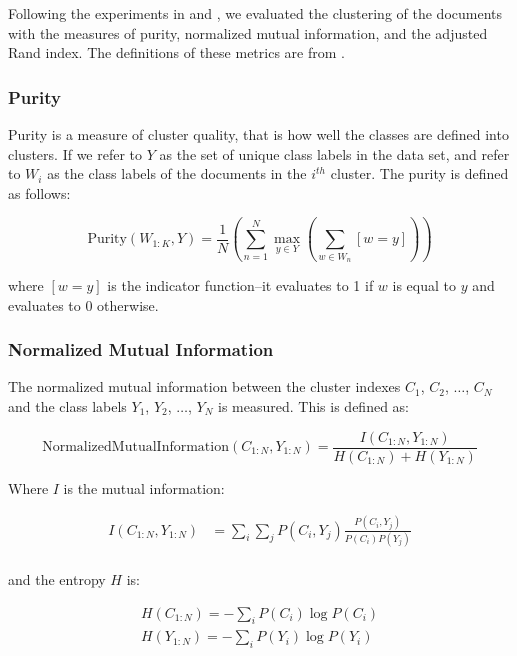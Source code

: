 \documentclass[11pt]{article}
\begin{document}
Following the experiments in \cite{Huang2008} and \cite{Hofmann2000}, we evaluated the clustering of the documents with the measures of purity, normalized mutual information, and the adjusted Rand index. The definitions of these metrics are from \cite{Manning2008}.

\subsubsection{Purity}

Purity is a measure of cluster quality, that is how well the classes are defined into clusters. If we refer to $Y$ as the set of unique class labels in the data set, and refer to $W_i$ as the class labels of the documents in the $i^{th}$ cluster. The purity is defined as follows:

\begin{equation}
{\text{Purity}}(W_{1:K}, Y) = \frac{1}{N} \left ( \sum_{n=1}^N \max_{y \in Y} \left (\sum_{w \in W_n} [w = y] \right ) \right )
\end{equation} 

where $[w=y]$ is the indicator function--it evaluates to 1 if $w$ is equal to $y$ and evaluates to 0 otherwise. 

\subsubsection{Normalized Mutual Information}

The normalized mutual information between the cluster indexes $C_1$, $C_2$, $\dots$, $C_N$ and the class labels  $Y_1$, $Y_2$, $\dots$, $Y_N$ is measured. This is defined as:

\begin{equation}
\text{NormalizedMutualInformation}(C_{1:N}, Y_{1:N}) = \frac{I(C_{1:N}, Y_{1:N}) }{H(C_{1:N}) + H(Y_{1:N}) }
\end{equation}

Where $I$ is the mutual information:

\begin{align}
I(C_{1:N}, Y_{1:N}) &= \sum_i \sum_j {P(C_i, Y_j)} \frac{P(C_i, Y_j)}{P(C_i)P(Y_j)} \\
\end{align}

and the entropy $H$ is:

\begin{align}
H(C_{1:N}) = - \sum_i P(C_i) \log P(C_i) \\
H(Y_{1:N}) = - \sum_i P(Y_i) \log P(Y_i) \\
\end{align}
\end{document}
